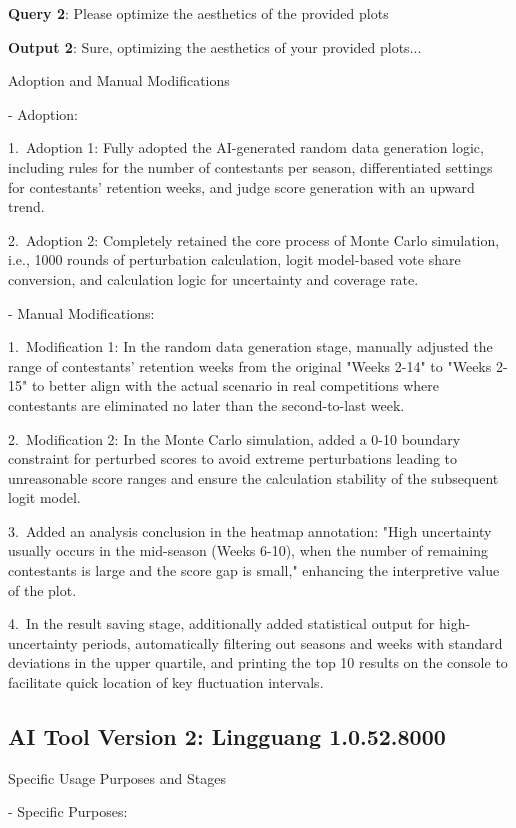 \documentclass{mcmthesis}
\begin{document}
\textbf{Query 2}: Please optimize the aesthetics of the provided plots

\textbf{Output 2}: Sure, optimizing the aesthetics of your provided plots...
 
Adoption and Manual Modifications
 
- Adoption:

1. Adoption 1: Fully adopted the AI-generated random data generation logic, including rules for the number of contestants per season, differentiated settings for contestants' retention weeks, and judge score generation with an upward trend.

2. Adoption 2: Completely retained the core process of Monte Carlo simulation, i.e., 1000 rounds of perturbation calculation, logit model-based vote share conversion, and calculation logic for uncertainty and coverage rate.

- Manual Modifications:

1. Modification 1: In the random data generation stage, manually adjusted the range of contestants' retention weeks from the original "Weeks 2-14" to "Weeks 2-15" to better align with the actual scenario in real competitions where contestants are eliminated no later than the second-to-last week.

2. Modification 2: In the Monte Carlo simulation, added a 0-10 boundary constraint for perturbed scores to avoid extreme perturbations leading to unreasonable score ranges and ensure the calculation stability of the subsequent logit model.

3. Added an analysis conclusion in the heatmap annotation: "High uncertainty usually occurs in the mid-season (Weeks 6-10), when the number of remaining contestants is large and the score gap is small," enhancing the interpretive value of the plot.

4. In the result saving stage, additionally added statistical output for high-uncertainty periods, automatically filtering out seasons and weeks with standard deviations in the upper quartile, and printing the top 10 results on the console to facilitate quick location of key fluctuation intervals.
 
\subsection*{AI Tool Version 2: Lingguang 1.0.52.8000}
 
Specific Usage Purposes and Stages
 
- Specific Purposes:
\end{document}
